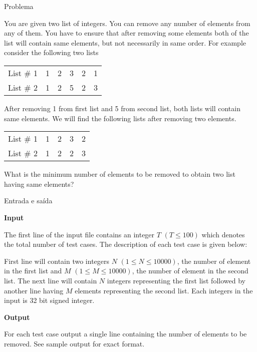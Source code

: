
\begin{frame}[fragile]{Problema}

You are given two list of integers. You can remove any number of elements from any of them. You
have to ensure that after removing some elements both of the list will contain same elements, but not
necessarily in same order. For example consider the following two lists
\begin{table}[h]
    \centering
    \begin{tabular}{|l|ccccc|}
    \hline
    List \# 1 & 1 & 2 & 3 & 2 & 1 \\
    List \# 2 & 1 & 2 & 5 & 2 & 3 \\
    \hline
    \end{tabular}
\end{table}

After removing 1 from first list and 5 from second list, both lists will contain same elements. We
will find the following lists after removing two elements.
\begin{table}[h]
    \centering
    \begin{tabular}{|l|cccc|}
    \hline
    List \# 1 & 1 & 2 & 3 & 2 \\
    List \# 2 & 1 & 2 & 2 & 3 \\
    \hline
    \end{tabular}
\end{table}

What is the minimum number of elements to be removed to obtain two list having same elements?
\end{frame}

\begin{frame}[fragile]{Entrada e saída}

\textbf{Input}

The first line of the input file contains an integer $T$ $(T\leq 100)$ which denotes the total 
number of test cases. The description of each test case is given below:

First line will contain two integers $N$ $(1 \leq N \leq 10000)$, the number of element in the 
first list and $M$ $(1\leq M\leq 10000)$, the number of element in the second list. The next line 
will contain $N$ integers
representing the first list followed by another line having $M$ elements representing the second list. Each integers in the input is 32 bit signed integer.

\textbf{Output}

For each test case output a single line containing the number of elements to be removed. See sample
output for exact format.
\end{frame}


